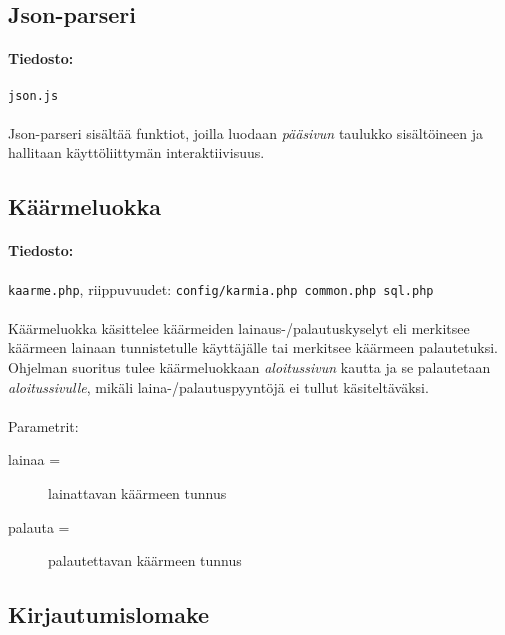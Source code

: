 \documentclass[11pt]{article}
\begin{document}

\subsection{Json-parseri}

\paragraph{Tiedosto:} \large{\texttt{json.js}}

\paragraph{} Json-parseri sisältää funktiot, joilla luodaan \emph{pääsivun} taulukko sisältöineen ja hallitaan käyttöliittymän interaktiivisuus.


\subsection{Käärmeluokka}

\paragraph{Tiedosto:} \large{\texttt{kaarme.php}}, riippuvuudet: \texttt{config/karmia.php common.php sql.php}

\paragraph{} Käärmeluokka käsittelee käärmeiden lainaus-/palautuskyselyt eli merkitsee käärmeen lainaan tunnistetulle käyttäjälle tai merkitsee käärmeen palautetuksi. Ohjelman suoritus tulee käärmeluokkaan \emph{aloitussivun} kautta ja se palautetaan \emph{aloitussivulle}, mikäli laina-/palautuspyyntöjä ei tullut käsiteltäväksi.

\paragraph{} Parametrit:
\begin{description}
\item[lainaa =] lainattavan käärmeen tunnus
\item[palauta =] palautettavan käärmeen tunnus
\end{description}


\subsection{Kirjautumislomake}
\end{document}
